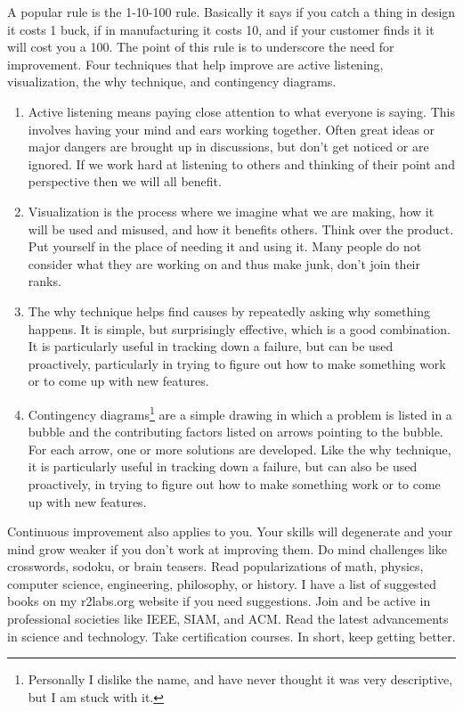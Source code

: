 A popular rule is the 1-10-100 rule.  Basically it says if you catch a thing in design it costs 1 buck, if in manufacturing it costs 10, and if your customer finds it it will cost you a 100.  The point of this rule is to underscore the need for improvement.  Four techniques that help improve are active listening, visualization, the why technique, and contingency diagrams.
\begin{enumerate}
\item Active listening means paying close attention to what everyone is saying.  This involves having your mind and ears working together.  Often great ideas or major dangers are brought up in discussions, but don't get noticed or are ignored.  If we work hard at listening to others and thinking of their point and perspective then we will all benefit.
\item Visualization is the process where we imagine what we are making, how it will be used and misused, and how it benefits others.  Think over the product.  Put yourself in the place of needing it and using it.  Many people do not consider what they are working on and thus make junk, don't join their ranks.
\item The why technique helps find causes by repeatedly asking why something happens.  It is simple, but surprisingly effective, which is a good combination.  It is particularly useful in tracking down a failure, but can be used proactively, particularly in trying to figure out how to make something work or to come up with new features.
\item Contingency diagrams\footnote{Personally I dislike the name, and have never thought it was very descriptive, but I am stuck with it.} are a simple drawing in which a problem is listed in a bubble and the contributing factors listed on arrows pointing to the bubble.  For each arrow, one or more solutions are developed. Like the why technique, it is particularly useful in tracking down a failure, but can also be used proactively, in trying to figure out how to make something work or to come up with new features.
\end{enumerate}

Continuous improvement also applies to you.  Your skills will degenerate and your mind grow weaker if you don't work at improving them.  Do mind challenges like crosswords, sodoku, or brain teasers.  Read popularizations of math, physics, computer science, engineering, philosophy, or history.  I have a list of suggested books on my r2labs.org website if you need suggestions.  Join and be active in professional societies like IEEE, SIAM, and ACM.  Read the latest advancements in science and technology.  Take certification courses.  In short, keep getting better.

